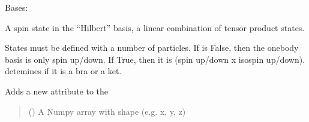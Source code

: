 \documentclass[letterpaper,10pt,english]{sphinxmanual}
\begin{document}
\begin{fulllineitems}
\label{\detokenize{spinbox:spinbox.core.HilbertState}}
\pysigstartsignatures
{}
\pysigstopsignatures
\sphinxAtStartPar
Bases: 

\sphinxAtStartPar
A spin state in the “Hilbert” basis, a linear combination of tensor product states.

\sphinxAtStartPar
States must be defined with a number of particles. 
If  is False, then the one\sphinxhyphen{}body basis is only spin up/down. If True, then it is (spin up/down x isospin up/down).
 detemines if it is a bra or a ket.

\begin{fulllineitems}
\label{\detokenize{spinbox:spinbox.core.HilbertState.attach_coordinates}}
\pysigstartsignatures
{}
\pysigstopsignatures
\sphinxAtStartPar
Adds a new  attribute to the 
\begin{quote}\begin{description}
\sphinxAtStartPar
{} () \textendash{} A Numpy array with shape  (e.g. x, y, z)

\end{description}\end{quote}

\end{fulllineitems}



\end{fulllineitems}
\end{document}
